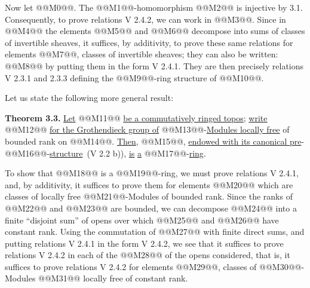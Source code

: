 Now let @@M0@@. The @@M1@@-homomorphism @@M2@@ is injective by 3.1. Consequently, to prove relations V 2.4.2, we can work in @@M3@@. Since in @@M4@@ the elements @@M5@@ and @@M6@@ decompose into sums of classes of invertible sheaves, it suffices, by additivity, to prove these same relations for elements @@M7@@, classes of invertible sheaves; they can also be written:
@@M8@@
by putting them in the form V 2.4.1. They are then precisely relations V 2.3.1 and 2.3.3 defining the @@M9@@-ring structure of @@M10@@.

Let us state the following more general result:

\textbf{Theorem 3.3.} \uline{Let} @@M11@@ \uline{be a commutatively ringed topos}; \uline{write} @@M12@@ \uline{for the Grothendieck group of} @@M13@@-\uline{Modules locally free} of bounded rank on @@M14@@. \uline{Then}, @@M15@@, \uline{endowed with its canonical pre}-@@M16@@-\uline{structure}~(V 2.2 b)), \uline{is} \uline{a} @@M17@@-\uline{ring}.

To show that @@M18@@ is a @@M19@@-ring, we must prove relations V 2.4.1, and, by additivity, it suffices to prove them for elements @@M20@@ which are classes of locally free @@M21@@-Modules of bounded rank. Since the ranks of @@M22@@ and @@M23@@ are bounded, we can decompose @@M24@@ into a finite ``disjoint sum'' of opens over which @@M25@@ and @@M26@@ have constant rank. Using the commutation of @@M27@@ with finite direct sums, and putting relations V 2.4.1 in the form V 2.4.2, we see that it suffices to prove relations V 2.4.2 in each of the @@M28@@ of the opens considered, that is, it suffices to prove relations V 2.4.2 for elements @@M29@@, classes of @@M30@@-Modules @@M31@@ locally free of constant rank.

